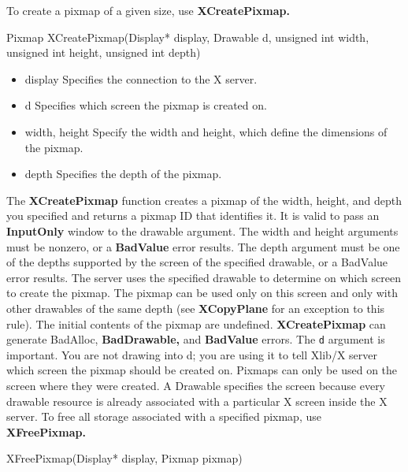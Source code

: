 \documentclass{report}
\begin{document}
\begin{itemize}
            \bigbreak \noindent 
            To create a pixmap of a given size, use \textbf{XCreatePixmap.}
            \begin{cppcode}
                Pixmap XCreatePixmap(Display* display, Drawable d, unsigned int width, unsigned int height, unsigned int depth)
            \end{cppcode}
            \bigbreak \noindent
            \begin{itemize}
                \item display Specifies the connection to the X server.
                \item d Specifies which screen the pixmap is created on.
                \item width, height Specify the width and height, which define the dimensions of the pixmap.
                \item depth Specifies the depth of the pixmap.
            \end{itemize}
            The \textbf{XCreatePixmap} function creates a pixmap of the width, height, and depth you specified and returns a pixmap ID that identifies it. It is valid to pass an \textbf{InputOnly} window to the drawable argument. The width and height arguments must be nonzero, or a \textbf{BadValue} error results. The depth argument must be one of the depths supported by the screen of the specified drawable, or a BadValue error results.
            \bigbreak \noindent 
            The server uses the specified drawable to determine on which screen to create the pixmap. The pixmap can be used only on this screen and only with other drawables of the same depth (see \textbf{XCopyPlane} for an exception to this rule). The initial contents of the pixmap are undefined. \textbf{XCreatePixmap} can generate BadAlloc, \textbf{BadDrawable,} and \textbf{BadValue} errors.
            \bigbreak \noindent 
            The \texttt{d} argument is important. You are not drawing into d; you are using it to tell Xlib/X server which screen the pixmap should be created on. Pixmaps can only be used on the screen where they were created.
            \bigbreak \noindent 
            A Drawable specifies the screen because every drawable resource is already associated with a particular X screen inside the X server.
            \bigbreak \noindent 
            To free all storage associated with a specified pixmap, use \textbf{XFreePixmap.}
            \bigbreak \noindent 
            \begin{cppcode}
                XFreePixmap(Display* display, Pixmap pixmap)

\end{cppcode}
\end{itemize}
\end{document}
